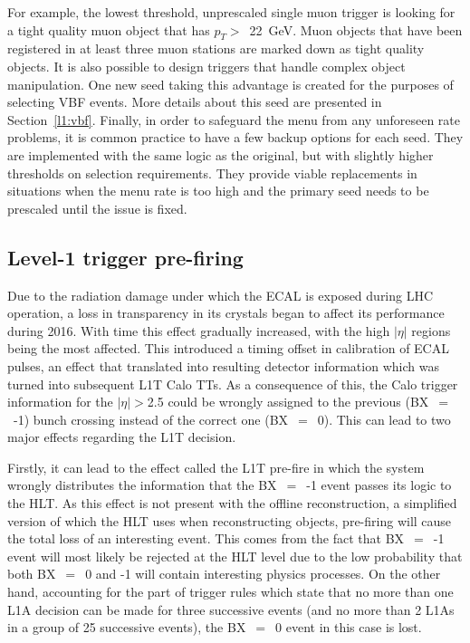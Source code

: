 \hspace{10pt}For example, the lowest threshold, unprescaled single muon trigger is looking for a tight quality muon object that has $p_T>$~22~GeV. Muon objects that have been registered in at least three muon stations are marked down as tight quality objects. It is also possible to design triggers that handle complex object manipulation. One new seed taking this advantage is created for the purposes of selecting VBF events. More details about this seed are presented in Section~\ref{l1:vbf}. Finally, in order to safeguard the menu from any unforeseen rate problems, it is common practice to have a few backup options for each seed. They are implemented with the same logic as the original, but with slightly higher thresholds on selection requirements. They provide viable replacements in situations when the menu rate is too high and the primary seed needs to be prescaled until the issue is fixed. 

\subsection{Level-1 trigger pre-firing}
\label{sec:l1_prefire}
\hspace{10pt} Due to the radiation damage under which the ECAL is exposed during LHC operation, a loss in transparency in its crystals began to affect its performance during 2016. With time this effect gradually increased, with the high $|\eta|$ regions being the most affected. This introduced a timing offset in calibration of ECAL pulses, an effect that translated into resulting detector information which was turned into subsequent L1T Calo TTs. As a consequence of this, the Calo trigger information for the $|\eta|>$2.5 could be wrongly assigned to the previous (BX~$=$~-1) bunch crossing instead of the correct one (BX~$=$~0). This can lead to two major effects regarding the L1T decision.

\hspace{10pt} Firstly, it can lead to the effect called the L1T pre-fire in which the system wrongly distributes the information that the BX~$=$~-1 event passes its logic to the HLT. As this effect is not present with the offline reconstruction, a simplified version of which the HLT uses when reconstructing objects, pre-firing will cause the total loss of an interesting event. This comes from the fact that BX~$=$~-1 event will most likely be rejected at the HLT level due to the low probability that both BX~$=$~0 and -1  will contain interesting physics processes. On the other hand, accounting for the part of trigger rules which state that no more than one L1A decision can be made for three successive events (and no more than 2 L1As in a group of 25 successive events), the BX~$=$~0 event in this case is lost.

